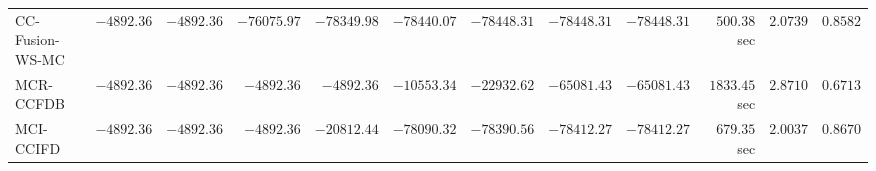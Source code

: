 \begin{table}[H]
\begin{tabular}{lrrrrrrrrrrr}
     CC-Fusion-WS-MC & $     -4892.36$ & $     -4892.36$ & $    -76075.97$ & $    -78349.98$ & $    -78440.07$ & $    -78448.31$ & $    -78448.31$ & $    -78448.31$ & $       500.38$ sec    & $       2.0739$  & $       0.8582$ \\ 
\cmidrule{1-1} 
           MCR-CCFDB & $     -4892.36$ & $     -4892.36$ & $     -4892.36$ & $     -4892.36$ & $    -10553.34$ & $    -22932.62$ & $    -65081.43$ & $    -65081.43$ & $      1833.45$ sec    & $       2.8710$  & $       0.6713$ \\ 
\cmidrule{1-1} 
           MCI-CCIFD & $     -4892.36$ & $     -4892.36$ & $     -4892.36$ & $    -20812.44$ & $    -78090.32$ & $    -78390.56$ & $    -78412.27$ & $    -78412.27$ & $       679.35$ sec    & $       2.0037$  & $       0.8670$ \\ 
\bottomrule
\end{tabular}
\end{table}